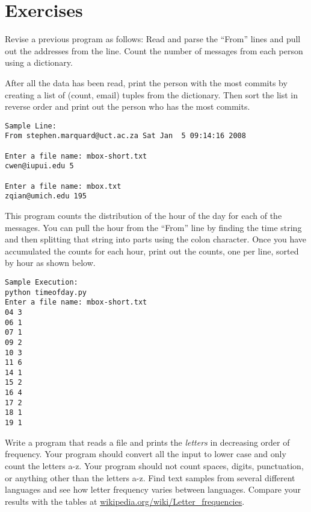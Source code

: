 \section{Exercises}

\begin{ex}
Revise a previous program as follows:  Read and 
parse the ``From'' lines and pull out the 
addresses from the line.   Count the number of
messages from each person using a dictionary.

After all the data has been read, print 
the person with the most commits by creating
a list of (count, email) tuples from the 
dictionary.   Then sort the list in reverse
order and print out the person who has the most
commits.

\beforeverb
\begin{verbatim}
Sample Line:
From stephen.marquard@uct.ac.za Sat Jan  5 09:14:16 2008

Enter a file name: mbox-short.txt
cwen@iupui.edu 5

Enter a file name: mbox.txt
zqian@umich.edu 195
\end{verbatim}
\afterverb
\end{ex}
\begin{ex}
This program counts the distribution of the hour of the day for 
each of the messages. You can pull the hour from the ``From'' 
line by finding the time string and then splitting that string 
into parts using the colon character. Once you have accumulated 
the counts for each hour, print out the counts, one per line, 
sorted by hour as shown below. 
\beforeverb
\begin{verbatim}
Sample Execution:
python timeofday.py
Enter a file name: mbox-short.txt
04 3
06 1
07 1
09 2
10 3
11 6
14 1
15 2
16 4
17 2
18 1
19 1
\end{verbatim}
\afterverb
\end{ex}


\begin{ex}
Write a program that reads a file and 
prints the {\em letters} in decreasing order of frequency.  Your program
should convert all the input to lower case and only count the letters a-z.
Your program should not count spaces, digits, punctuation, or anything 
other than the letters a-z.
Find text samples from several different languages and see how letter frequency
varies between languages.  Compare your results with the tables at
\url{wikipedia.org/wiki/Letter_frequencies}.


\end{ex}

